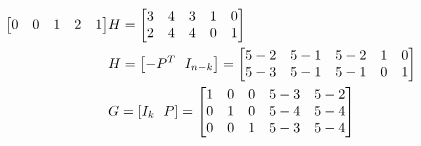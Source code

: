 \begin{example*}
\begin{align*}
\begin{bmatrix}
0&0&1&2&1
\end{bmatrix} & H=\begin{bmatrix}
3&4&3&1&0\\
2&4&4&0&1
\end{bmatrix}\\
&H=\left[{\huge -P^T\ I_{n-k}}\right]=\begin{bmatrix}
5-2 & 5-1 & 5-2 & 1 & 0\\
5-3 & 5-1 & 5-1 & 0 & 1
\end{bmatrix}\\
&G=\left[{\huge I_k\ P}\right]=\begin{bmatrix}
1 & 0 & 0 & 5-3 & 5-2\\
0 & 1 & 0 & 5-4 & 5-4\\
0 & 0 & 1 & 5-3 & 5-4
\end{bmatrix}
\end{align*}
\end{example*}

